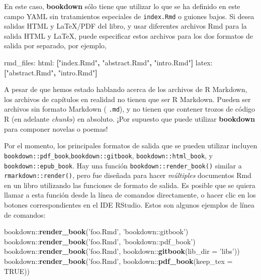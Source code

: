 \documentclass[12pt,]{krantz}
\makeatletter
\newenvironment{Shaded}{\begin{snugshade}}{\end{snugshade}}
\newcommand{\KeywordTok}[1]{\textcolor[rgb]{0.13,0.29,0.53}{\textbf{{#1}}}}
\newcommand{\DataTypeTok}[1]{\textcolor[rgb]{0.13,0.29,0.53}{{#1}}}
\newcommand{\StringTok}[1]{\textcolor[rgb]{0.31,0.60,0.02}{{#1}}}
\newcommand{\OtherTok}[1]{\textcolor[rgb]{0.56,0.35,0.01}{{#1}}}
\newcommand{\FunctionTok}[1]{\textcolor[rgb]{0.00,0.00,0.00}{{#1}}}
\newcommand{\NormalTok}[1]{{#1}}
\newenvironment{kframe}{%
\medskip{}
\setlength{\fboxsep}{.8em}
 \def\at@end@of@kframe{}%
 \ifinner\ifhmode%
  \def\at@end@of@kframe{\end{minipage}}%
  \begin{minipage}{\columnwidth}%
 \fi\fi%
 \def\FrameCommand##1{\hskip\@totalleftmargin \hskip-\fboxsep
 \colorbox{shadecolor}{##1}\hskip-\fboxsep
     \hskip-\linewidth \hskip-\@totalleftmargin \hskip\columnwidth}%
 \MakeFramed {\advance\hsize-\width
   \@totalleftmargin\z@ \linewidth\hsize
   \@setminipage}}%
 {\par\unskip\endMakeFramed%
 \at@end@of@kframe}
\renewenvironment{Shaded}{\begin{kframe}}{\end{kframe}}
\theoremstyle{definition}
\theoremstyle{definition}
\theoremstyle{remark}
\makeatother
\begin{document}
En este caso, \textbf{bookdown} sólo tiene que utilizar lo que se ha
definido en este campo YAML sin tratamientos especiales de
\texttt{index.Rmd} o guiones bajos. Si desea salidas HTML y LaTeX/PDF
del libro, y usar diferentes archivos Rmd para la salida HTML y LaTeX,
puede especificar estos archivos para los dos formatos de salida por
separado, por ejemplo,

\begin{Shaded}
\begin{Highlighting}[]
\FunctionTok{rmd_files:}
  \FunctionTok{html:} \KeywordTok{[}\StringTok{"index.Rmd"}\KeywordTok{,} \StringTok{"abstract.Rmd"}\KeywordTok{,} \StringTok{"intro.Rmd"}\KeywordTok{]}
  \FunctionTok{latex:} \KeywordTok{[}\StringTok{"abstract.Rmd"}\KeywordTok{,} \StringTok{"intro.Rmd"}\KeywordTok{]}
\end{Highlighting}
\end{Shaded}

A pesar de que hemos estado hablando acerca de los archivos de R
Markdown, los archivos de capítulos en realidad no tienen que ser R
Markdown. Pueden ser archivos sin formato Markdown ( \texttt{.md}), y no
tienen que contener trozos de código R (en adelante \emph{chunks}) en
absoluto. ¡Por supuesto que puede utilizar \textbf{bookdown} para
componer novelas o poemas!

Por el momento, los principales formatos de salida que se pueden
utilizar incluyen
\texttt{bookdown::pdf\_book},\texttt{bookdown::gitbook},
\texttt{bookdown::html\_book}, y \texttt{bookdown::epub\_book}. Hay una
función \texttt{bookdown::render\_book()}
 similar a \texttt{rmarkdown::render()},
pero fue diseñada para hacer \emph{múltiples} documentos Rmd en un libro
utilizando las funciones de formato de salida. Es posible que se quiera
llamar a esta función desde la línea de comandos directamente, o hacer
clic en los botones correspondientes en el IDE RStudio. Estos son
algunos ejemplos de línea de comandos:

\begin{Shaded}
\begin{Highlighting}[]
\NormalTok{bookdown::}\KeywordTok{render_book}\NormalTok{(}\StringTok{'foo.Rmd'}\NormalTok{, }\StringTok{'bookdown::gitbook'}\NormalTok{)}
\NormalTok{bookdown::}\KeywordTok{render_book}\NormalTok{(}\StringTok{'foo.Rmd'}\NormalTok{, }\StringTok{'bookdown::pdf_book'}\NormalTok{)}
\NormalTok{bookdown::}\KeywordTok{render_book}\NormalTok{(}\StringTok{'foo.Rmd'}\NormalTok{, bookdown::}\KeywordTok{gitbook}\NormalTok{(}\DataTypeTok{lib_dir =} \StringTok{'libs'}\NormalTok{))}
\NormalTok{bookdown::}\KeywordTok{render_book}\NormalTok{(}\StringTok{'foo.Rmd'}\NormalTok{, bookdown::}\KeywordTok{pdf_book}\NormalTok{(}\DataTypeTok{keep_tex =} \OtherTok{TRUE}\NormalTok{))}
\end{Highlighting}
\end{Shaded}
\end{document}
